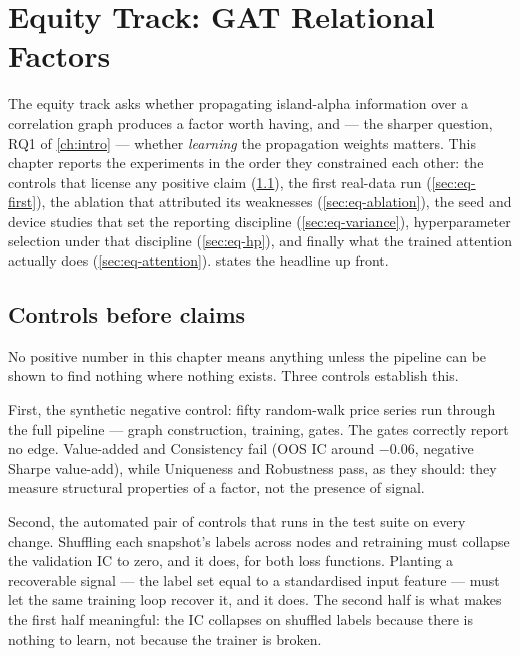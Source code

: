 \chapter{Equity Track: GAT Relational Factors}
\label{ch:equity}

The equity track asks whether propagating island-alpha information over a
correlation graph produces a factor worth having, and --- the sharper
question, RQ1 of \cref{ch:intro} --- whether \emph{learning} the
propagation weights matters. This
chapter reports the experiments in the order they constrained each other:
the controls that license any positive claim (\cref{sec:eq-controls}),
the first real-data run (\cref{sec:eq-first}), the ablation that
attributed its weaknesses (\cref{sec:eq-ablation}), the seed and device
studies that set the reporting discipline (\cref{sec:eq-variance}),
hyperparameter selection under that discipline
(\cref{sec:eq-hp}), and finally what the trained attention actually does
(\cref{sec:eq-attention}).  states the headline
up front.



\section{Controls before claims}
\label{sec:eq-controls}

No positive number in this chapter means anything unless the pipeline can
be shown to find nothing where nothing exists. Three controls establish
this.

First, the synthetic negative control: fifty random-walk price series run
through the full pipeline --- graph construction, training, gates. The
gates correctly report no edge. Value-added and Consistency fail (OOS IC
around $-0.06$, negative Sharpe value-add), while Uniqueness and
Robustness pass, as they should: they measure structural properties of a
factor, not the presence of signal.

Second, the automated pair of controls that runs in the test suite on
every change. Shuffling each snapshot's labels across nodes and retraining
must collapse the validation IC to zero, and it does, for both loss
functions. Planting a recoverable signal --- the label set equal to a
standardised input feature --- must let the same training loop recover it,
and it does. The second half is what makes the first half meaningful: the
IC collapses on shuffled labels because there is nothing to learn, not
because the trainer is broken.

